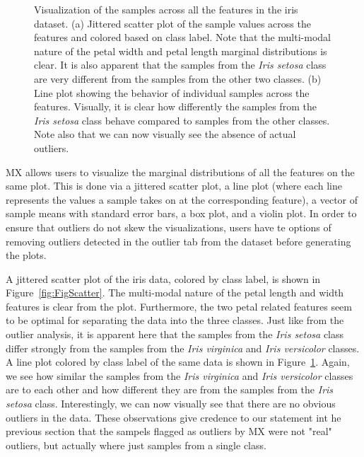 \documentclass[review]{siamart0516}
\begin{document}
\begin{figure}[t!]
\begin{subfigure}[t]{0.48\textwidth}
		\subcaption{}
		\label{fig:FigLine}
	\end{subfigure}
	\vspace{-1.5\baselineskip}
	\caption{Visualization of the samples across all the features in the iris dataset. (a) Jittered scatter plot of the sample values across the features and colored based on class label. Note that the multi-modal nature of the petal width and petal length marginal distributions is clear. It is also apparent that the samples from the \textit{Iris setosa} class are very different from the samples from the other two classes. (b) Line plot showing the behavior of individual samples across the features. Visually, it is clear how differently the samples from the \textit{Iris setosa} class behave compared to samples from the other classes. Note also that we can now visually see the absence of actual outliers.}
	\label{fig:FigFeature}
\end{figure}

MX allows users to visualize the marginal distributions of all the features on the same plot. This is done via a jittered scatter plot, a line plot (where each line represents the values a sample takes on at the corresponding feature), a vector of sample means with standard error bars, a box plot, and a violin plot. In order to ensure that outliers do not skew the visualizations, users have te options of removing outliers detected in the outlier tab from the dataset before generating the plots. 

A jittered scatter plot of the iris data, colored by class label, is shown in Figure~\ref{fig:FigScatter}. The multi-modal nature of the petal length and width features is clear from the plot. Furthermore, the two petal related features seem to be optimal for separating the data into the three classes. Just like from the outlier analysis, it is apparent here that the samples from the \textit{Iris setosa} class differ strongly from the samples from the \textit{Iris virginica} and \textit{Iris versicolor} classes. A line plot colored by class label of the same data is shown in Figure~\ref{fig:FigLine}. Again, we see how similar the samples from the \textit{Iris virginica} and \textit{Iris versicolor} classes are to each other and how different they are from the samples from the \textit{Iris setosa} class. Interestingly, we can now visually see that there are no obvious outliers in the data. These observations give credence to our statement int he previous section that the sampels flagged as outliers by MX were not "real" outliers, but actually where just samples from a single class.
\end{document}
